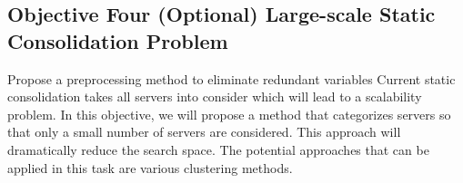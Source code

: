 \subsection{Objective Four (Optional) Large-scale Static Consolidation Problem}
Propose a preprocessing method to eliminate redundant variables 
Current static consolidation takes all servers into consider which will lead to a scalability problem. In this objective, we will propose a method that categorizes servers so that only a small number of servers are considered. This approach will dramatically reduce the search space. The potential approaches that can be applied in this task are various clustering methods.



